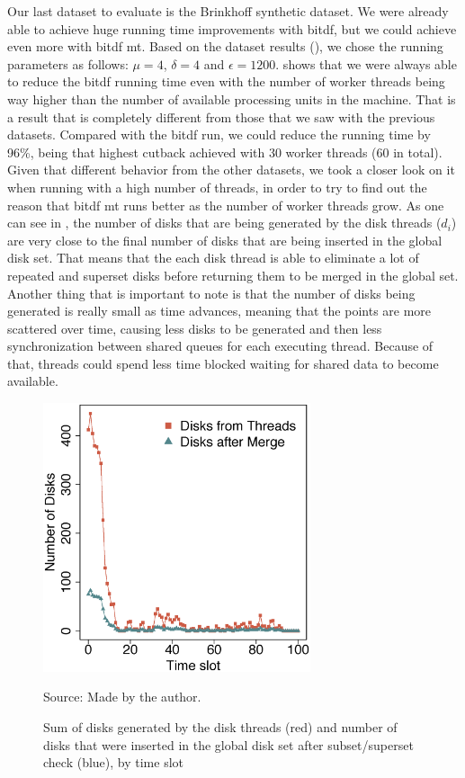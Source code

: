 {Our last dataset to evaluate is the Brinkhoff synthetic dataset. We were already able to achieve huge running time
improvements with \ac{bitdf}, but we could achieve even more with \ac{bitdf} \ac{mt}. Based on the dataset results
(), we chose the running parameters as follows: $\mu=4$, $\delta=4$ and $\epsilon=1200$.
 shows that we were always able to reduce the \ac{bitdf} running time even with the number
of worker threads being way higher than the number of available processing units in the machine. That is a result that
is completely different from those that we saw with the previous datasets. Compared with the \ac{bitdf} run, we could
reduce the running time by 96\%, being that highest cutback achieved with 30 worker threads (60 in total). Given that
different behavior from the other datasets, we took a closer look on it when running with a high number of threads, in
order to try to find out the reason that \ac{bitdf} \ac{mt} runs better as the number of worker threads grow. As one can
see in , the number of disks that are being generated by the disk threads ($d_i$)
are very close to the final number of disks that are being inserted in the global disk set. That means that the each
disk thread is able to eliminate a lot of repeated and superset disks before returning them to be merged in the global
set. Another thing that is important to note is that the number of disks being generated is really small as time
advances, meaning that the points are more scattered over time, causing less disks to be generated and then less
synchronization between shared queues for each executing thread. Because of that, threads could spend less time blocked
waiting for shared data to become available.

\begin{figure}[h!]
    \centering
    \caption{Sum of disks generated by the disk threads (red) and number of disks that were inserted in the global disk
        set after subset/superset check (blue), by time slot}
    \centerline{\includegraphics[width=0.7\textwidth]{images/Brinkhoff_disks_threads.eps}}
    \footnotesize{Source: Made by the author.}
    \label{fig:brinkhoff_disks_threads}
\end{figure}

}
